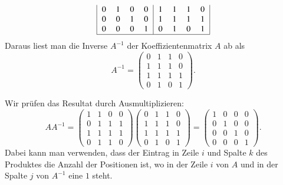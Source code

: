 \begin{loesung}
\begin{teilaufgaben}
\begin{align*}
\begin{tabular}{|>{$}c<{$}>{$}c<{$}>{$}c<{$}>{$}c<{$}|>{$}c<{$}>{$}c<{$}>{$}c<{$}>{$}c<{$}|}
   0 & 1 & 0 & 0 &  1 & 1 & 1 & 0 \\
   0 & 0 & 1 & 0 &  1 & 1 & 1 & 1 \\
   0 & 0 & 0 & 1 &  0 & 1 & 0 & 1 \\
\hline
\end{tabular}
\end{align*}
Daraus liest man die Inverse $A^{-1}$ der Koeffizientenmatrix $A$ ab als
\[
A^{-1}
=
\begin{pmatrix}
   0 & 1 & 1 & 0 \\
   1 & 1 & 1 & 0 \\
   1 & 1 & 1 & 1 \\
   0 & 1 & 0 & 1 
\end{pmatrix}.
\]
\item Wir prüfen das Resultat durch Ausmultiplizieren:
\[
AA^{-1}
=
\begin{pmatrix}
   1 & 1 & 0 & 0 \\
   0 & 1 & 1 & 1 \\
   1 & 1 & 1 & 1 \\
   0 & 1 & 1 & 0 
\end{pmatrix}
\begin{pmatrix}
   0 & 1 & 1 & 0 \\
   1 & 1 & 1 & 0 \\
   1 & 1 & 1 & 1 \\
   0 & 1 & 0 & 1 
\end{pmatrix}
=
\begin{pmatrix}
   1 & 0 & 0 & 0 \\
   0 & 1 & 0 & 0 \\
   0 & 0 & 1 & 0 \\
   0 & 0 & 0 & 1 
\end{pmatrix}.
\]
Dabei kann man verwenden, dass der Eintrag in Zeile $i$ und Spalte $k$ des
Produktes die Anzahl der Positionen ist, wo in der Zeile $i$ von $A$
und in der Spalte $j$ von $A^{-1}$ eine $1$ steht.
\qedhere
\end{teilaufgaben}
\end{loesung}
